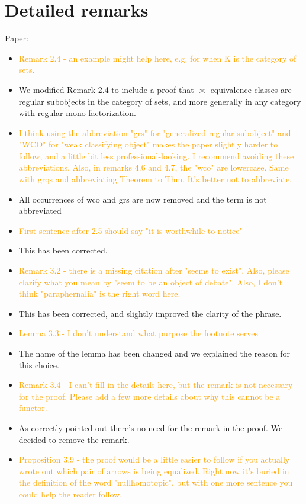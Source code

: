 \documentclass{amsart}
\begin{document}
\section*{Detailed remarks}
Paper:
\begin{itemize}
\item \textcolor{orange}{Remark 2.4 - an example might help here, e.g. for when K is the category of sets.}
\item We modified Remark 2.4 to include a proof that $\asymp$-equivalence classes are regular subobjects in the category of sets, and more generally in any category with regular-mono factorization.
\item \textcolor{orange}{I think using the abbreviation "grs" for "generalized regular subobject" and "WCO" for "weak classifying object" makes the paper slightly harder to follow, and a little bit less professional-looking. I recommend avoiding these abbreviations. Also, in remarks 4.6 and 4.7, the "wco" are lowercase. Same with grqs and abbreviating Theorem to Thm. It's better not to abbreviate.}
\item All occurrences of wco and grs are now removed and the term is not abbreviated
\item \textcolor{orange}{First sentence after 2.5 should say "it is worthwhile to notice"}
\item This has been corrected.
\item \textcolor{orange}{Remark 3.2 - there is a missing citation after "seems to exist". Also, please clarify what you mean by "seem to be an object of debate". Also, I don't think "paraphernalia" is the right word here.}
\item This has been corrected, and slightly improved the clarity of the phrase.
\item \textcolor{orange}{Lemma 3.3 - I don't understand what purpose the footnote serves}
\item The name of the lemma has been changed and we explained the reason for this choice.
\item \textcolor{orange}{Remark 3.4 - I can't fill in the details here, but the remark is not necessary for the proof. Please add a few more details about why this cannot be a functor.}
\item As correctly pointed out there's no need for the remark in the proof. We decided to remove the remark.
\item \textcolor{orange}{Proposition 3.9 - the proof would be a little easier to follow if you actually wrote out which pair of arrows is being equalized. Right now it's buried in the definition of the word "nullhomotopic", but with one more sentence you could help the reader follow.}

\end{itemize}
\end{document}
